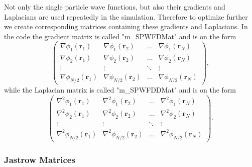 \documentclass[../main.tex]{subfiles}
\begin{document}
Not only the single particle wave functions, but also their gradients and Laplacians are used repeatedly in the simulation. Therefore to optimize further we create corresponding matrices containing these gradients and Laplacians. In the code the gradient matrix is called "m\_SPWFDMat" and is on the form
\begin{equation}
    \left( \begin{array}{cccc} \nabla\phi_1(\mathbf{r}_1) & \nabla\phi_1(\mathbf{r}_2) & \dots & \nabla\phi_1(\mathbf{r}_N)\\
                                \nabla\phi_2(\mathbf{r}_1) & \nabla\phi_2(\mathbf{r}_2) & \dots & \nabla\phi_2(\mathbf{r}_N)\\
                                \vdots & \vdots & \ddots & \vdots\\
                                \nabla\phi_{N/2}(\mathbf{r}_1) & \nabla\phi_{N/2}(\mathbf{r}_2) & \dots & \nabla\phi_{N/2}(\mathbf{r}_N)

             \end{array} \right),
\end{equation}
while the Laplacian matrix is called "m\_SPWFDDMat" and is on the form
\begin{equation}
    \left( \begin{array}{cccc} \nabla^2\phi_1(\mathbf{r}_1) & \nabla^2\phi_1(\mathbf{r}_2) & \dots & \nabla^2\phi_1(\mathbf{r}_N)\\
                                \nabla^2\phi_2(\mathbf{r}_1) & \nabla^2\phi_2(\mathbf{r}_2) & \dots & \nabla^2\phi_2(\mathbf{r}_N)\\
                                \vdots & \vdots & \ddots & \vdots\\
                                \nabla^2\phi_{N/2}(\mathbf{r}_1) & \nabla^2\phi_{N/2}(\mathbf{r}_2) & \dots & \nabla^2\phi_{N/2}(\mathbf{r}_N)

             \end{array} \right).
\end{equation}

\subsubsection{Jastrow Matrices}
\end{document}
